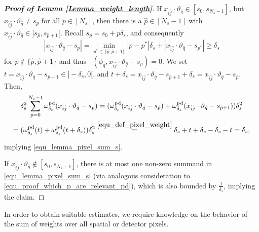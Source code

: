 \documentclass[11pt,reqno]{amsart}
\newcommand{\sums}{\sum_{p=0}^{N_s-1}}
\DeclareMathOperator{\PixelWeight}{\omega^\mathrm{pd}_{\delta_\mathit{s}}}
\numberwithin{theorem}{section}
\theoremstyle{remark}
\begin{document}
\begin{proof}[\textbf{Proof of Lemma \ref{Lemma_weight_length}}]
If $x_{\hat i \hat j}\cdot\vartheta_{\hat q}\in [s_0,s_{N_s-1}]$, but $x_{\hat i \hat j}\cdot\vartheta_{\hat q}\neq s_p$ for all $p\in [N_s]$, then there is a $\hat p\in [N_s-1]$ with $x_{\hat i \hat j}\cdot\vartheta_{\hat q}\in ]s_{\hat p},s_{\hat p+1}[$. Recall $s_p=s_0+p \delta_s$, and consequently 
\begin{equation} \label{equ_proof_which_p_are_relevant_pd}
|x_{\hat i \hat j}\cdot\vartheta_{\hat q}-s_p|= \min_{p^* \in \{\hat p,\hat p +1\}} |p-p^*|\delta_s+|x_{\hat i \hat j}\cdot\vartheta_{\hat q}-s_{p^*}|\geq \delta_s
\end{equation}
for $p\not \in \{\hat p,\hat p+1\}$ and thus $\PixelWeight(\phi_q,x_{\hat i \hat j}\cdot \vartheta_{\hat q}-s_p)=0$. 
We set $t = x_{\hat i \hat j}\cdot \vartheta_{\hat q}-s_{\hat p+1} \in ]-\delta_s,0[$, and $t+\delta_s = x_{\hat i \hat j}\cdot \vartheta_{\hat q}-s_{\hat p+1} +\delta_s= x_{\hat i \hat j}\cdot \vartheta_{\hat q}-s_{\hat p}$. 
Then, 
\begin{multline}
 \delta_s^2 \sums \PixelWeight(x_{\hat i \hat j}\cdot \vartheta_{\hat q} -s_p)=(\PixelWeight(x_{\hat i \hat j}\cdot \vartheta_{\hat q} -s_{\hat p})+\PixelWeight(x_{\hat i \hat j}\cdot \vartheta_{\hat q} -s_{\hat p+1}))\delta_s^2
\\
 = (\PixelWeight(t)+\PixelWeight(t+\delta_s))\delta_s^2 \underset{\text{}}{\overset{\eqref{equ_def_pixel_weight}}{=}} \delta_s +t + \delta_s - \delta_s-t = \delta_s,
\end{multline} implying \eqref{equ_lemma_pixel_sum_s}.

If $x_{\hat i \hat j}\cdot\vartheta_{\hat q} \not \in [s_0,s_{N_s-1}]$, there is at most one non-zero summand in \eqref{equ_lemma_pixel_sum_s} (via analogous consideration to \eqref{equ_proof_which_p_are_relevant_pd}), which is also bounded by $\frac{1}{\delta_s}$, implying the claim.
\end{proof}







In order to obtain suitable estimates, we require knowledge on the behavior of the sum of weights over all spatial or detector pixels.
\end{document}
